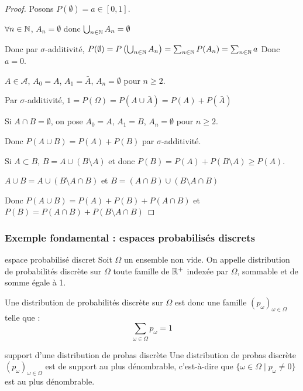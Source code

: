 \begin{proof}
    Posons $P(\emptyset) = a \in [0, 1]$.

    $\forall n \in \mathbb{N}$, $A_n = \emptyset$ donc $\bigcup_{n \in \mathbb{N}} A_n = \emptyset$

    Donc par $\sigma$-additivité, $P(\emptyset) = P\left( \bigcup_{n \in \mathbb{N}} A_n \right) = \sum_{n \in \mathbb{N}} P(A_n) = \sum_{n \in \mathbb{N}} a$
    Donc $a = 0$.

    $A \in \mathcal A$, $A_0 = A$, $A_1 = \bar A$, $A_n = \emptyset$ pour $n \geqslant 2$.

    Par $\sigma$-additivité, $1 = P(\Omega) = P(A \cup \bar A) = P(A) + P(\bar A) $

    Si $A \cap B = \emptyset$, on pose $A_0 = A$, $A_1 = B$, $A_n = \emptyset$ pour $n \geqslant 2$.

    Donc $P(A \cup B) = P(A) + P(B)$ par $\sigma$-additivité.

    Si $A \subset B$, $B = A \cup (B \setminus A)$ et donc $P(B) = P(A) + P(B \setminus A) \geqslant P(A)$.

    $A \cup B = A \cup (B \setminus A\cap B)$ et $B = (A \cap B) \cup (B \setminus A \cap B)$

    Donc $P(A \cup B) = P(A) + P(B) + P(A \cap B)$ et $P(B) = P(A \cap B) + P(B \setminus A \cap B)$
\end{proof}


\subsubsection{Exemple fondamental : espaces probabilisés discrets }

\begin{definition}{espace probabilisé discret}{}
    Soit $\Omega$ un ensemble non vide. On appelle distribution de probabilités 
    discrète sur $\Omega$ toute famille de $\mathbb{R}^+$ indexée par $\Omega$, sommable 
    et de somme égale à 1.     

    Une distribution de probabilités discrète sur $\Omega$ est donc une famille 
    $(p_\omega)_{\omega \in \Omega}$ telle que : 
    $$ \sum_{\omega \in \Omega } p_\omega = 1$$
\end{definition}

\begin{proposition}{support d'une distribution de probas discrète}{}
    Une distribution de probas discrète $(p_\omega)_{\omega \in \Omega}$
    est de support au plus dénombrable, c'est-à-dire que 
    $\{\omega \in \Omega \mid p_\omega \neq 0 \}$ est au plus dénombrable.
\end{proposition}

